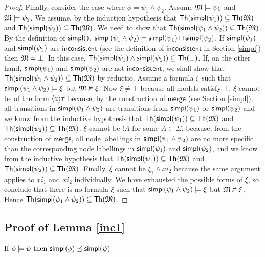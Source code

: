 \begin{proof}
Finally, consider the case where $\phi = \psi_1 \land \psi_2$.
Assume $\frak{M} \models \psi_1$ and $\frak{M} \models \psi_2$.
We assume, by the induction hypothesis that $\mathsf{Th}(\mathsf{simpl}(\psi_1)) \subseteq \mathsf{Th}(\frak{M})$ and $\mathsf{Th}(\mathsf{simpl}(\psi_2)) \subseteq \mathsf{Th}(\frak{M})$.
We need to show that $\mathsf{Th}(\mathsf{simpl}(\psi_1\land \psi_2)) \subseteq \mathsf{Th}(\frak{M})$.
By the definition of $\mathsf{simpl}()$, $\mathsf{simpl}(\psi_1 \land \psi_2) = \mathsf{simpl}(\psi_1) \sqcap \mathsf{simpl}(\psi_2)$.
If $\mathsf{simpl}(\psi_1)$ and $\mathsf{simpl}(\psi_2)$ are $\mathsf{inconsistent}$ (see the definition of $\mathsf{inconsistent}$ in Section \ref{simpl}) then $\frak{M} = \bot$. In this case, $\mathsf{Th}(\mathsf{simpl}(\psi_1) \land \mathsf{simpl}(\psi_2)) \subseteq \mathsf{Th}(\bot)$.
If, on the other hand, $\mathsf{simpl}(\psi_1)$ and $\mathsf{simpl}(\psi_2)$ are not $\mathsf{inconsistent}$, we shall show that $\mathsf{Th}(\mathsf{simpl}(\psi_1 \land \psi_2)) \subseteq \mathsf{Th}(\frak{M})$ by reductio.
Assume a formula $\xi$ such that $\mathsf{simpl}(\psi_1 \land \psi_2) \models \xi$ but $\frak{M} \nvDash \xi$.
Now $\xi \neq \top$ because all models satisfy $\top$.
$\xi$ cannot be of the form $\langle a \rangle \tau$ because, by the construction of $\mathsf{merge}$ (see Section \ref{simpl}), all transitions in $\mathsf{simpl}(\psi_1 \land \psi_2)$ are transitions from $\mathsf{simpl}(\psi_1)$ or $\mathsf{simpl}(\psi_2)$ and we know from the inductive hypothesis that $\mathsf{Th}(\mathsf{simpl}(\psi_1)) \subseteq \mathsf{Th}(\frak{M})$ and $\mathsf{Th}(\mathsf{simpl}(\psi_2)) \subseteq \mathsf{Th}(\frak{M})$.
$\xi$ cannot be $!A$ for some $A \subset \Sigma$, because, from the construction of $\mathsf{merge}$, all node labellings in $\mathsf{simpl}(\psi_1 \land \psi_2)$ are no more specific than the corresponding node labellings in $\mathsf{simpl}(\psi_1)$ and $\mathsf{simpl}(\psi_2)$, and we know from the inductive hypothesis that $\mathsf{Th}(\mathsf{simpl}(\psi_1)) \subseteq \mathsf{Th}(\frak{M})$ and $\mathsf{Th}(\mathsf{simpl}(\psi_2)) \subseteq \mathsf{Th}(\frak{M})$.
Finally, $\xi$ cannot be $\xi_1 \land xi_2$ because the same argument applies to $xi_1$ and $xi_2$ individually.
We have exhausted the possible forms of $\xi$, so conclude that there is no formula $\xi$ such that $\mathsf{simpl}(\psi_1 \land \psi_2) \models \xi$ but $\frak{M} \nvDash \xi$.
Hence $\mathsf{Th}(\mathsf{simpl}(\psi_1\land \psi_2)) \subseteq \mathsf{Th}(\frak{M})$.
\end{proof}


\subsection{Proof of Lemma \ref{inc1}}
If $\phi \models \psi \mbox{ then } \mathsf{simpl}(\phi) \preceq \mathsf{simpl}(\psi)$

